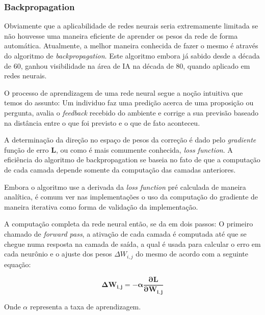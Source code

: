 \subsubsection{Backpropagation}

Obviamente que a aplicabilidade de redes neurais seria extremamente limitada se
não houvesse uma maneira eficiente de aprender os pesos da rede de forma
automática.  Atualmente, a melhor maneira conhecida de fazer o mesmo é através
do algoritmo de \emph{backpropagation}. Este algoritmo embora já sabido desde a
década de 60, ganhou visibilidade na área de IA na década de 80, quando
aplicado em redes neurais.\citep{russell1995modern}

O processo de aprendizagem de uma rede neural segue a noção intuitiva que temos
do assunto: Um individuo faz uma predição acerca de uma proposição ou pergunta,
avalia o \emph{feedback} recebido do ambiente e corrige a sua previsão baseado
na distância entre o que foi previsto e o que de fato aconteceu.

A determinação da direção no espaço de pesos da correção é dado pelo
\emph{gradiente} função de erro $\mathbf{L}$, ou como é mais comumente
conhecida, \emph{loss function}. A eficiência do algoritmo de backpropagation
se baseia no fato de que a computação de cada camada depende somente da
computação das camadas anteriores.

Embora o algoritmo use a derivada da \emph{loss function} pré calculada de
maneira analítica, é comum ver nas implementações o uso da computação do
gradiente de maneira iterativa como forma de validação da implementação.

A computação completa da rede neural então, se da em dois passos: O primeiro
chamado de \emph{forward pass}, a ativação de cada camada é computada até que
se chegue numa resposta na camada de saída, a qual é usada para calcular o erro
em cada neurônio e o ajuste dos pesos $\Delta W_{i,j}$ do mesmo de acordo com a
seguinte equação:

$$ \mathbf{\Delta W_{i,j} = -\alpha\frac{\partial L}{\partial W_{i,j}}} $$

Onde $\alpha$ representa a taxa de aprendizagem.
